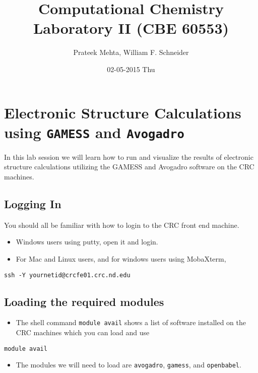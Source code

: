\documentclass[11pt]{article}
\author{Prateek Mehta, William F. Schneider}
\date{02-05-2015 Thu}
\title{Computational Chemistry Laboratory II (CBE 60553)}
\begin{document}
\maketitle

\section{Electronic Structure Calculations using \texttt{GAMESS} and \texttt{Avogadro}}
\label{sec-1}

In this lab session we will learn how to run and visualize the results of electronic structure calculations utilizing the GAMESS and Avogadro software on the CRC machines.

\subsection{Logging In}
\label{sec-1-1}

You should all be familiar with how to login to the CRC front end machine.

\begin{itemize}
\item Windows users using putty, open it and login.

\item For Mac and Linux users, and for windows users using MobaXterm,
\end{itemize}

\begin{verbatim}
ssh -Y yournetid@crcfe01.crc.nd.edu
\end{verbatim}

\subsection{Loading the required modules}
\label{sec-1-2}

\begin{itemize}
\item The shell command \verb~module avail~ shows a list of software installed on the CRC machines which you can load and use
\end{itemize}

\begin{verbatim}
module avail
\end{verbatim}


\begin{itemize}
\item The modules we will need to load are \verb~avogadro~, \verb~gamess~, and \verb~openbabel~.
\end{itemize}
\end{document}
